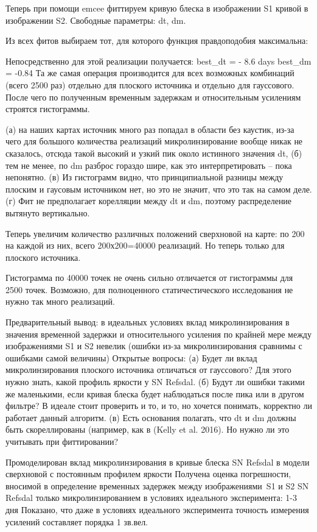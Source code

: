 Теперь при помощи emcee фиттируем кривую блеска в изображении S1 кривой в изображении S2. Свободные параметры: dt, dm. 

Из всех фитов выбираем тот, для которого функция правдоподобия максимальна:

Непосредственно для этой реализации получается:
best_dt = - 8.6 days
best_dm = -0.84
Та же самая операция производится для всех возможных комбинаций (всего 2500 раз) отдельно для плоского источника и отдельно для гауссового. После чего по полученным временным задержкам и относительным усилениям строятся гистограммы. 

(а) на наших картах источник много раз попадал в области без каустик, из-за чего для большого количества реализаций микролинзирование вообще никак не сказалось, отсюда такой высокий и узкий пик около истинного значения dt, 
(б) тем не менее, по dm разброс гораздо шире, как это интерпретировать – пока непонятно. 
(в) Из гистограмм видно, что принципиальной разницы между плоским и гаусовым источником нет, но это не значит, что это так на самом деле. 
(г) Фит не предполагает корелляции между dt и dm, поэтому распределение вытянуто вертикально.

Теперь увеличим количество различных положений сверхновой на карте: по 200 на каждой из них, всего 200х200=40000 реализаций. Но теперь только для плоского источника.

Гистограмма по 40000 точек не очень сильно отличается от гистограммы для 2500 точек. Возможно, для полноценного статичестического исследования не нужно так много реализаций.

Предварительный вывод: в идеальных условиях вклад микролинзирования в значения временной задержки и относительного усиления по крайней мере между изображениями S1 и S2 невелик (ошибки из-за микролинзирования сравнимы с ошибками самой величины)
Открытые вопросы: 
(а) Будет ли вклад микролинзирования  плоского источника отличаться от гауссового? Для этого нужно знать, какой профиль яркости у SN Refsdal.
(б) Будут ли ошибки такими же маленькими, если кривая блеска будет наблюдаться после пика или в другом фильтре? В идеале стоит проверить и то, и то, но хочется понимать, корректно ли работает данный алгоритм.
(в) Есть основания полагать, что dt и dm должны быть скореллированы (например, как в (Kelly et al. 2016). Но нужно ли это учитывать при фиттировании?



Промоделирован вклад микролинзирования в кривые блеска SN Refsdal в модели сверхновой с постоянным профилем яркости
Получена оценка погрешности, вносимой в определение временных задержек между изображениями S1 и S2 SN Refsdal только микролинзированием в условиях идеального эксперимента: 1-3 дня
Показано, что даже в условиях идеального эксперимента точность измерения усилений составляет порядка 1 зв.вел. 


